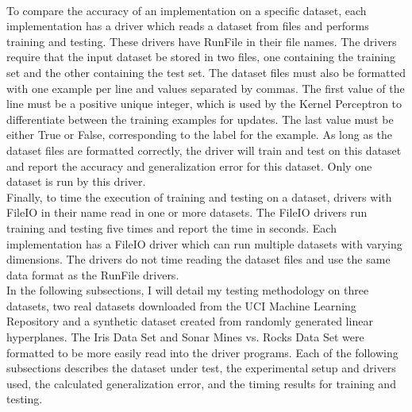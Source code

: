 \\To compare the accuracy of an implementation on a specific dataset, each implementation has a driver which reads a dataset from files and performs training and testing. These drivers have RunFile in their file names. The drivers require that the input dataset be stored in two files, one containing the training set and the other containing the test set. The dataset files must also be formatted with one example per line and values separated by commas. The first value of the line must be a positive unique integer, which is used by the Kernel Perceptron to differentiate between the training examples for updates. The last value must be either True or False, corresponding to the label for the example. As long as the dataset files are formatted correctly, the driver will train and test on this dataset and report the accuracy and generalization error for this dataset. Only one dataset is run by this driver.
\\Finally, to time the execution of training and testing on a dataset, drivers with FileIO in their name read in one or more datasets. The FileIO drivers run training and testing five times and report the time in seconds. Each implementation has a FileIO driver which can run multiple datasets with varying dimensions. The drivers do not time reading the dataset files and use the same data format as the RunFile drivers. 
\\In the following subsections, I will detail my testing methodology on three datasets, two real datasets downloaded from the UCI Machine Learning Repository \cite{DG17} and a synthetic dataset created from randomly generated linear hyperplanes. The Iris Data Set \cite{Fis36} and Sonar Mines vs. Rocks Data Set \cite{SG88} were formatted to be more easily read into the driver programs. Each of the following subsections describes the dataset under test, the experimental setup and drivers used, the calculated generalization error, and the timing results for training and testing.
